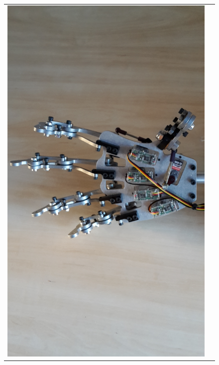 \documentclass[progress]{cmpreport}
\begin{document}
\begin{figure}[H]
\begin{tabular}{ll}
		\includegraphics[trim=20cm 0cm 22cm 0cm, clip=true, totalheight=0.28\textheight, angle=-90]{photos/Day10.jpg}
	\end{tabular}
\end{figure}
\end{document}
